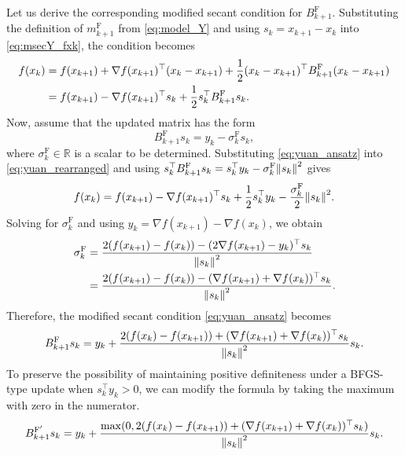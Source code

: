 \documentclass[0_en]{subfiles}
\begin{document}
Let us derive the corresponding modified secant condition for $B^{\mathrm{F}}_{k+1}$.
Substituting the definition of $m^{\mathrm{F}}_{k+1}$ from \cref{eq:model_Y} and using $s_k = x_{k+1} - x_k$ into \cref{eq:msecY_fxk}, the condition becomes
\begin{align}
    f(x_k) & = f(x_{k+1}) + \nabla f(x_{k+1})^\top (x_k - x_{k+1}) + \frac{1}{2} (x_k - x_{k+1})^\top B^{\mathrm{F}}_{k+1} (x_k - x_{k+1}) \notag \\
           & = f(x_{k+1}) - \nabla f(x_{k+1})^\top s_k + \frac{1}{2} s_k^\top B^{\mathrm{F}}_{k+1} s_k. \label{eq:yuan_rearranged}
\end{align}
Now, assume that the updated matrix has the form
\begin{equation}\label{eq:yuan_ansatz}
    B^{\mathrm{F}}_{k+1} s_k = y_k - \sigma^\mathrm{F}_k s_k,
\end{equation}
where $\sigma^\mathrm{F}_k \in \mathbb{R}$ is a scalar to be determined.
Substituting \cref{eq:yuan_ansatz} into \cref{eq:yuan_rearranged} and using $s_k^\top B^{\mathrm{F}}_{k+1} s_k = s_k^\top y_k - \sigma^\mathrm{F}_k \norm{s_k}^2$ gives
\begin{equation}\label{eq:yuan_substituted}
    f(x_k) = f(x_{k+1}) - \nabla f(x_{k+1})^\top s_k + \frac{1}{2} s_k^\top y_k - \frac{\sigma^\mathrm{F}_k}{2} \norm{s_k}^2.
\end{equation}
Solving for $\sigma^\mathrm{F}_k$ and using $y_k = \nabla f(x_{k+1}) - \nabla f(x_k)$, we obtain
\begin{align}
    \sigma^\mathrm{F}_k & = \frac{2(f(x_{k+1}) - f(x_k)) - (2\nabla f(x_{k+1}) - y_k)^\top s_k}{\norm{s_k}^2}           \\
                        & = \frac{2(f(x_{k+1}) - f(x_k)) - (\nabla f(x_{k+1}) + \nabla f(x_k))^\top s_k}{\norm{s_k}^2}.
    \label{eq:C_simplified}
\end{align}
Therefore, the modified secant condition \cref{eq:yuan_ansatz} becomes
\begin{equation}
    B^{\mathrm{F}}_{k+1} s_k = y_k + \frac{2(f(x_k) - f(x_{k+1})) + (\nabla f(x_{k+1}) + \nabla f(x_k))^\top s_k}{\norm{s_k}^2} s_k.
    \label{eq:msecY_raw}
\end{equation}
To preserve the possibility of maintaining positive definiteness under a BFGS-type update when $s_k^\top y_k > 0$, we can modify the formula by taking the maximum with zero in the numerator.
\begin{equation}
    B^{\mathrm{F}'}_{k+1} s_k = y_k + \frac{\max(0, 2(f(x_k) - f(x_{k+1})) + (\nabla f(x_{k+1}) + \nabla f(x_k))^\top s_k)}{\norm{s_k}^2} s_k.
    \label{eq:msecY_final}
\end{equation}
\end{document}
